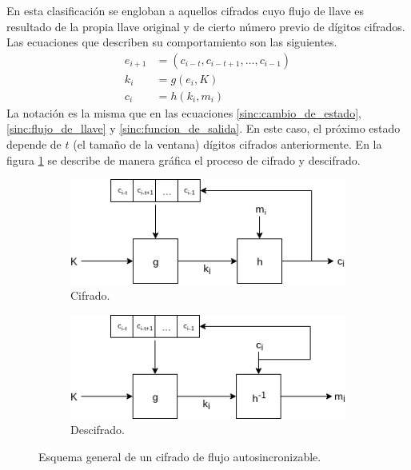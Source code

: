 En esta clasificación se engloban a aquellos cifrados cuyo flujo de llave es
resultado de la propia llave original y de cierto número previo de dígitos
cifrados. Las ecuaciones que describen su comportamiento son las siguientes.
\begin{align}
  \label{asinc:cambio_de_estado}
  e_{i+1} &= (c_{i - t}, c_{i - t + 1}, \dots, c_{i - 1}) \\
  \label{asinc:flujo_de_llave}
  k_i &= g(e_i, K) \\
  \label{asinc:funcion_de_salida}
  c_i &= h(k_i, m_i)
\end{align}
La notación es la misma que en las ecuaciones \ref{sinc:cambio_de_estado},
\ref{sinc:flujo_de_llave} y \ref{sinc:funcion_de_salida}. En este caso, el
próximo estado depende de $ t $ (el tamaño de la ventana) dígitos cifrados
anteriormente. En la figura \ref{flujo_asincrono} se describe de manera
gráfica el proceso de cifrado y descifrado.

\begin{figure}
  \centering
  \begin{subfigure}{0.45\textwidth}
    \begin{center}
      \includegraphics[width=0.9\linewidth]{diagramas/asincrono_cifrado.png}
      \caption{Cifrado.}
    \end{center}
  \end{subfigure}
  \begin{subfigure}{0.45\textwidth}
    \begin{center}
      \includegraphics[width=0.9\linewidth]{diagramas/asincrono_descifrado.png}
      \caption{Descifrado.}
    \end{center}
  \end{subfigure}
  \caption{Esquema general de un cifrado de flujo autosincronizable.}
  \label{flujo_asincrono}
\end{figure}

